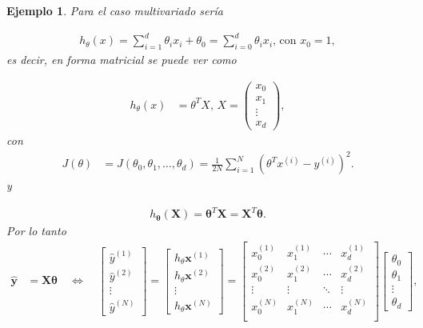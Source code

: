 \documentclass[12pt]{article}
\newtheorem{Ejem}{Ejemplo}%
\begin{document}
\begin{Ejem}
Para el caso multivariado ser\'ia

\begin{eqnarray*}
h_{\theta}\left(x\right)=\sum_{i=1}^{d}\theta_{i}x_{i}+\theta_{0}=\sum_{i=0}^{d}\theta_{i}x_{i}\textrm{, con }x_{0}=1,
\end{eqnarray*}
es decir, en forma matricial se puede ver como

\begin{eqnarray*}
h_{\theta}(x) &= \theta^{T} X\textrm{, } X = \begin{pmatrix} x_0 \\ x_1 \\ \vdots \\ x_d \end{pmatrix},
\end{eqnarray*}
con 
\begin{eqnarray*}
J(\theta) &= J(\theta_0, \theta_1, \ldots, \theta_d) = \frac{1}{2N} \sum_{i=1}^{N} \left( \theta^{T} x^{(i)} - y^{(i)} \right)^2.
\end{eqnarray*}
y

\begin{eqnarray*}
h_{\mathbf{\theta}}(\mathbf{X}) = \mathbf{\theta}^{T} \mathbf{X} = \mathbf{X}^{T} \mathbf{\theta}.
\end{eqnarray*}
Por lo tanto
\begin{eqnarray*}
\hat{\textbf{y}} &= \mathbf{X} \mathbf{\theta} \quad \Leftrightarrow \quad 
\begin{bmatrix}
\hat{y}^{(1)} \\
\hat{y}^{(2)} \\
\vdots \\
\hat{y}^{(N)}
\end{bmatrix} =
\begin{bmatrix}
h_{\theta}\mathbf{x}^{(1)} \\
h_{\theta}\mathbf{x}^{(2)} \\
\vdots \\
h_{\theta}\mathbf{x}^{(N)}
\end{bmatrix}= 
\begin{bmatrix}
x_0^{(1)} & x_1^{(1)} & \cdots & x_d^{(1)} \\
x_0^{(2)} & x_1^{(2)} & \cdots & x_d^{(2)} \\
\vdots & \vdots & \ddots & \vdots \\
x_0^{(N)} & x_1^{(N)} & \cdots & x_d^{(N)} \\
\end{bmatrix}
\begin{bmatrix}
\theta_0 \\
\theta_1 \\
\vdots \\
\theta_d
\end{bmatrix},
\end{eqnarray*}


\end{Ejem}
\end{document}
